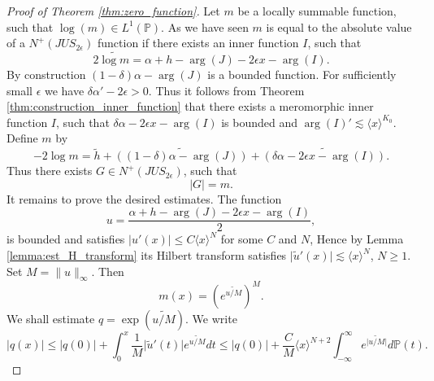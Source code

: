 \documentclass{article}[12pt]
\newcommand{\norm}[1]{\lVert#1\rVert}
\theoremstyle{remark}
\begin{document}
\begin{proof}[Proof of Theorem \ref{thm:zero_function}]
            Let $m$ be a locally summable function, such that $\log(m) \in L^{1}(\mathbb{P})$. As we have seen $m$ is equal to the absolute value of a $N^{+}(JUS_{2\epsilon})$ function if there exists an inner function $I$, such that
            \begin{equation*}
                2\widetilde{\log m} = \alpha + h -\arg(J) - 2\epsilon x - \arg(I).
            \end{equation*}
            By construction $(1-\delta)\alpha - \arg(J)$ is a bounded function. For sufficiently small $\epsilon$ we have $\delta \alpha' - 2\epsilon > 0$. Thus it follows from Theorem \ref{thm:construction_inner_function} that there exists a meromorphic inner function $I$, such that $\delta \alpha -2\epsilon x - \arg(I)$ is bounded and $\arg(I)' \lesssim \langle x \rangle^{K_{0}}$. Define $m$ by
            \begin{equation*}
                - 2\log m = \tilde{h} + \widetilde{\left((1-\delta)\alpha - \arg(J)\right)} + \widetilde{\left(\delta \alpha-2\epsilon x - \arg(I)\right)}.
            \end{equation*}
            Thus there exists $G \in N^{+}(JUS_{2\epsilon})$, such that
            \begin{equation*}
                \lvert G \rvert = m.
            \end{equation*}
            It remains to prove the desired estimates. The function
            \begin{equation*}
                u = \frac{\alpha + h -\arg(J) - 2\epsilon x - \arg(I)}{2},
            \end{equation*}
            is bounded and satisfies $\lvert u'(x) \rvert\leq C\langle x \rangle^{N}$ for some $C$ and $N$, Hence by Lemma \ref{lemma:est_H_transform} its Hilbert transform satisfies $\lvert \widetilde{u}'(x) \rvert \lesssim \langle x \rangle^{N}$, $N \geq 1$. Set $M = \norm{u}_{\infty}$. Then
            \begin{equation*}
                m(x) = \left( e^{\widetilde{u/M}}\right)^{M}.
            \end{equation*}
            We shall estimate $q = \exp(\widetilde{u/M})$. We write
            \begin{equation*}
                \lvert q(x) \rvert \leq \lvert q(0) \rvert + \int_{0}^{x} \frac{1}{M}\lvert \widetilde{u}'(t) \rvert e^{\widetilde{u/M}}dt \leq \lvert q(0) \rvert + \frac{C}{M}\langle x \rangle^{N+2}\int_{-\infty}^{\infty}e^{\lvert \widetilde{u/M} \rvert}d\mathbb{P}(t).
            \end{equation*}

\end{proof}
\end{document}
